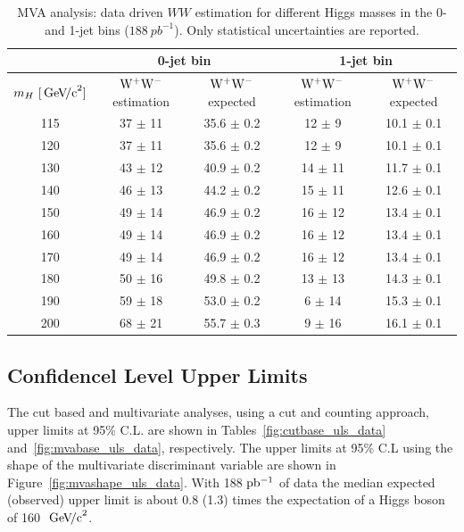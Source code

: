 \begin{table}[!htbp]
\begin{center}
\begin{tabular}{|c|c|c|c|c|} \hline
 & \multicolumn{2}{|c|}{0-jet bin} & \multicolumn{2}{|c|}{1-jet bin} \\ \hline
$m_H~[\,\mathrm{Ge\kern -0.1em V\!/c}^2]$ & $\mathrm{W}^+\mathrm{W}^-$ estimation & $\mathrm{W}^+\mathrm{W}^-$ expected & $\mathrm{W}^+\mathrm{W}^-$ estimation & $\mathrm{W}^+\mathrm{W}^-$ expected \\ \hline
115 & 37 $\pm$ 11 & 35.6 $\pm$ 0.2 & 12 $\pm$ 9 & 10.1 $\pm$ 0.1 \\
120 & 37 $\pm$ 11 & 35.6 $\pm$ 0.2 & 12 $\pm$ 9 & 10.1 $\pm$ 0.1 \\
130 & 43 $\pm$ 12 & 40.9 $\pm$ 0.2 & 14 $\pm$ 11& 11.7 $\pm$ 0.1 \\
140 & 46 $\pm$ 13 & 44.2 $\pm$ 0.2 & 15 $\pm$ 11& 12.6 $\pm$ 0.1 \\
150 & 49 $\pm$ 14 & 46.9 $\pm$ 0.2 & 16 $\pm$ 12& 13.4 $\pm$ 0.1 \\
160 & 49 $\pm$ 14 & 46.9 $\pm$ 0.2 & 16 $\pm$ 12& 13.4 $\pm$ 0.1 \\
170 & 49 $\pm$ 14 & 46.9 $\pm$ 0.2 & 16 $\pm$ 12& 13.4 $\pm$ 0.1 \\
180 & 50 $\pm$ 16 & 49.8 $\pm$ 0.2 & 13 $\pm$ 13& 14.3 $\pm$ 0.1 \\
190 & 59 $\pm$ 18 & 53.0 $\pm$ 0.2 &  6 $\pm$ 14& 15.3 $\pm$ 0.1 \\
200 & 68 $\pm$ 21 & 55.7 $\pm$ 0.3 &  9 $\pm$ 16& 16.1 $\pm$ 0.1 \\  \hline
\end{tabular}
\caption{MVA analysis: data driven $WW$ estimation for different Higgs masses in the 0- and 1-jet bins ($188~pb^{-1}$). 
Only statistical uncertainties are reported.}
\label{tab:wwEstimResDataMVA}
\end{center}
\end{table}

\subsection{Confidencel Level Upper Limits}
The cut based and multivariate analyses, using a cut and counting approach, 
upper limits at 95\% C.L. are shown in Tables~\ref{fig:cutbase_uls_data} 
and~\ref{fig:mvabase_uls_data}, respectively. The upper limits at 95\% C.L using 
the shape of the multivariate discriminant variable are shown in 
Figure~\ref{fig:mvashape_uls_data}.
With 188 $\mathrm{pb^{-1}}$ of data the median expected (observed) upper limit is about 0.8 (1.3) times the expectation 
of a Higgs boson of 160~$\,\mathrm{Ge\kern -0.1em V\!/c}^2$.

